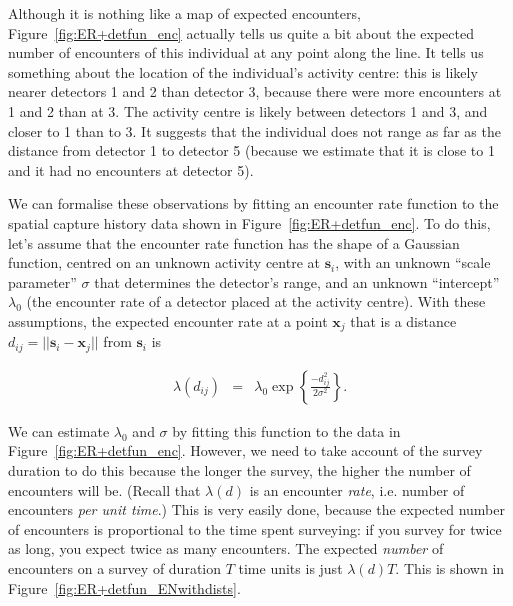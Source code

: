 \documentclass[graybox,envcountchap,sectrefs]{SpringerStyleFiles/styles/svmono}\usepackage[]{graphicx}\usepackage[]{color}
\newcommand{\be}{\begin{eqnarray}}
\newcommand{\ee}{\end{eqnarray}}
\begin{document}
Although it is nothing like a map of expected encounters, Figure~\ref{fig:ER+detfun_enc} actually tells us quite a bit about the expected number of encounters of this individual at any point along the line. It tells us something about the location of the individual's activity centre: this is likely nearer detectors 1 and 2 than detector 3, because there were more encounters at 1 and 2 than at 3. The activity centre is likely between detectors 1 and 3, and closer to 1 than to 3. It suggests that the individual does not range as far as the distance from detector 1 to detector 5 (because we estimate that it is close to 1 and it had no encounters at detector 5). 

We can formalise these observations by fitting an encounter rate function to the spatial capture history data shown in Figure~\ref{fig:ER+detfun_enc}. To do this, let's assume that the encounter rate function has the shape of a Gaussian function, centred on an unknown activity centre at $\bm{s}_i$, with an unknown ``scale parameter'' $\sigma$ that determines the detector's range, and an unknown ``intercept'' $\lambda_0$ (the encounter rate of a detector placed at the activity centre). With these assumptions, the expected encounter rate at a point $\bm{x}_j$ that is a distance $d_{ij}=||\bm{s}_i-\bm{x}_j||$ from $\bm{s}_i$ is

\be
\lambda(d_{ij})&=&\lambda_0\exp\left\{\frac{-d_{ij}^2}{2\sigma^2}\right\}.
\label{eq:ER+detfun.lambda.hn}
\ee

We can estimate $\lambda_0$ and $\sigma$ by fitting this function to the data in Figure~\ref{fig:ER+detfun_enc}. However, we need to take account of the survey duration to do this because the longer the survey, the higher the number of encounters will be. (Recall that $\lambda(d)$ is an encounter \textit{rate}, i.e. number of encounters \textit{per unit time}.) This is very easily done, because the expected number of encounters is proportional to the time spent surveying: if you survey for twice as long, you expect twice as many encounters. The expected \textit{number} of encounters on a survey of duration $T$ time units is just $\lambda(d)T$. This is shown in Figure~\ref{fig:ER+detfun_ENwithdists}.
\end{document}
